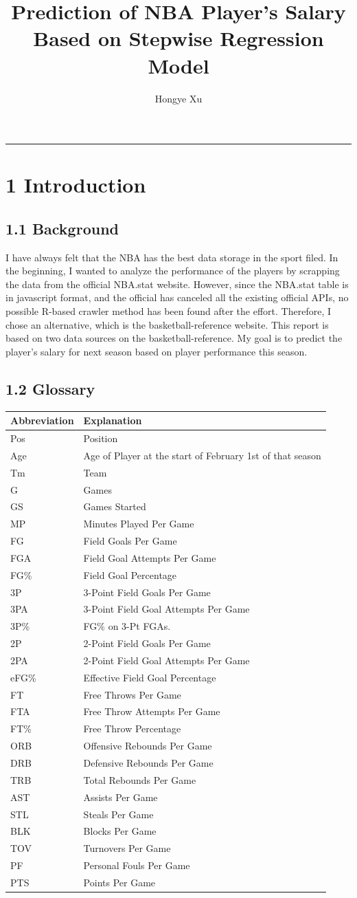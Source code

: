 \documentclass[]{article}
\title{Prediction of NBA Player's Salary Based on Stepwise Regression Model}
\author{Hongye Xu}
\date{}
\begin{document}
\maketitle

\begin{center}\rule{0.5\linewidth}{\linethickness}\end{center}

\section{1 Introduction}\label{introduction}

\subsection{1.1 Background}\label{background}

I have always felt that the NBA has the best data storage in the sport
filed. In the beginning, I wanted to analyze the performance of the
players by scrapping the data from the official NBA.stat website.
However, since the NBA.stat table is in javascript format, and the
official has canceled all the existing official APIs, no possible
R-based crawler method has been found after the effort. Therefore, I
chose an alternative, which is the basketball-reference website. This
report is based on two data sources on the basketball-reference. My goal
is to predict the player's salary for next season based on player
performance this season.

\subsection{1.2 Glossary}\label{glossary}

\begin{longtable}[]{@{}ll@{}}
\toprule
Abbreviation & Explanation\tabularnewline
\midrule
\endhead
Pos & Position\tabularnewline
Age & Age of Player at the start of February 1st of that
season\tabularnewline
Tm & Team\tabularnewline
G & Games\tabularnewline
GS & Games Started\tabularnewline
MP & Minutes Played Per Game\tabularnewline
FG & Field Goals Per Game\tabularnewline
FGA & Field Goal Attempts Per Game\tabularnewline
FG\% & Field Goal Percentage\tabularnewline
3P & 3-Point Field Goals Per Game\tabularnewline
3PA & 3-Point Field Goal Attempts Per Game\tabularnewline
3P\% & FG\% on 3-Pt FGAs.\tabularnewline
2P & 2-Point Field Goals Per Game\tabularnewline
2PA & 2-Point Field Goal Attempts Per Game\tabularnewline
eFG\% & Effective Field Goal Percentage\tabularnewline
FT & Free Throws Per Game\tabularnewline
FTA & Free Throw Attempts Per Game\tabularnewline
FT\% & Free Throw Percentage\tabularnewline
ORB & Offensive Rebounds Per Game\tabularnewline
DRB & Defensive Rebounds Per Game\tabularnewline
TRB & Total Rebounds Per Game\tabularnewline
AST & Assists Per Game\tabularnewline
STL & Steals Per Game\tabularnewline
BLK & Blocks Per Game\tabularnewline
TOV & Turnovers Per Game\tabularnewline
PF & Personal Fouls Per Game\tabularnewline
PTS & Points Per Game\tabularnewline
\bottomrule
\end{longtable}
\end{document}
